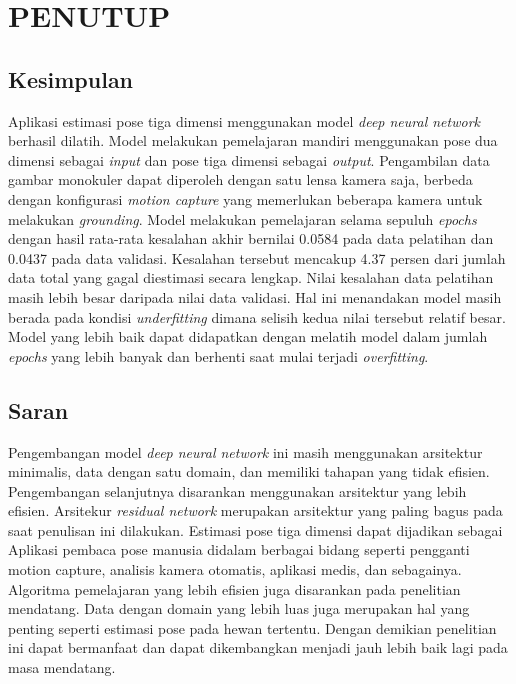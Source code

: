 
\chapter{PENUTUP}
\label{cha:5-PENUTUP}

\section{Kesimpulan}
\label{sec:5-Kesimpulan}

Aplikasi estimasi pose tiga dimensi menggunakan model \textit{deep neural network} berhasil dilatih.
Model melakukan pemelajaran mandiri menggunakan pose dua dimensi sebagai \textit{input}
dan pose tiga dimensi sebagai \textit{output}.
Pengambilan data gambar monokuler dapat diperoleh dengan satu
lensa kamera saja, berbeda dengan konfigurasi \textit{motion capture}
yang memerlukan beberapa kamera untuk melakukan \textit{grounding}.
Model melakukan pemelajaran
selama sepuluh \textit{epochs} dengan hasil rata-rata kesalahan akhir bernilai 0.0584 pada data pelatihan
dan 0.0437 pada data validasi. Kesalahan tersebut mencakup 4.37 persen dari jumlah
data total yang gagal diestimasi secara lengkap.
Nilai kesalahan data pelatihan masih lebih besar daripada nilai data validasi.
Hal ini menandakan model masih berada pada kondisi \textit{underfitting} dimana selisih kedua nilai tersebut relatif
besar. Model yang lebih baik dapat didapatkan dengan melatih model dalam jumlah \textit{epochs} yang
lebih banyak dan berhenti saat mulai terjadi \textit{overfitting}.

\section{Saran}
\label{sec:5-Saran}

Pengembangan model \textit{deep neural network} ini masih menggunakan arsitektur minimalis, data dengan
satu domain, dan memiliki tahapan yang tidak efisien. Pengembangan selanjutnya disarankan menggunakan
arsitektur yang lebih efisien. Arsitekur \textit{residual network} merupakan arsitektur yang paling
bagus pada saat penulisan ini dilakukan. Estimasi pose tiga dimensi dapat dijadikan sebagai Aplikasi
pembaca pose manusia didalam berbagai bidang seperti pengganti motion capture, analisis kamera otomatis,
aplikasi medis, dan sebagainya.
Algoritma pemelajaran yang lebih efisien juga disarankan
pada penelitian mendatang. Data dengan domain yang lebih luas juga merupakan hal yang penting seperti
estimasi pose pada hewan tertentu. Dengan demikian penelitian ini dapat bermanfaat dan dapat dikembangkan
menjadi jauh lebih baik lagi pada masa mendatang.